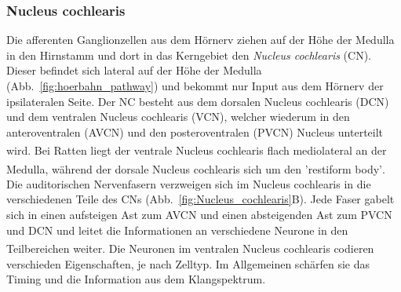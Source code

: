 \documentclass[12pt,a4paper,pdftex]{article}
\begin{document}
\subsubsection*{Nucleus cochlearis}

Die afferenten Ganglionzellen aus dem Hörnerv ziehen auf der Höhe der Medulla in den Hirnstamm und dort in das Kerngebiet den \textit{Nucleus cochlearis} (CN).  Dieser befindet sich  lateral auf der Höhe der Medulla (Abb.~\ref{fig:hoerbahn_pathway}) und bekommt nur Input aus dem Hörnerv der ipsilateralen Seite. Der NC besteht aus dem dorsalen Nucleus cochlearis (DCN) und dem ventralen Nucleus cochlearis (VCN), welcher wiederum in den anteroventralen (AVCN) und den posteroventralen (PVCN) Nucleus unterteilt wird\textsuperscript{\cite[22]{paxinos2014rat}}. Bei Ratten liegt der ventrale Nucleus cochlearis flach mediolateral an der Medulla, während der dorsale Nucleus cochlearis sich um den 'restiform body'\textsuperscript{\cite[22]{paxinos2014rat}}.
\\ \noindent Die auditorischen Nervenfasern verzweigen sich im Nucleus cochlearis in die verschiedenen Teile des CNs (Abb.~\ref{fig:Nucleus_cochlearis}B). Jede Faser gabelt sich in einen aufsteigen Ast zum AVCN und einen absteigenden Ast zum PVCN und DCN und leitet die Informationen an verschiedene Neurone in den Teilbereichen weiter\textsuperscript{\cite[22]{paxinos2014rat}}. Die Neuronen im ventralen Nucleus cochlearis codieren verschieden Eigenschaften, je nach Zelltyp. Im Allgemeinen schärfen sie das Timing und die Information aus dem Klangspektrum. 
\\
\end{document}
